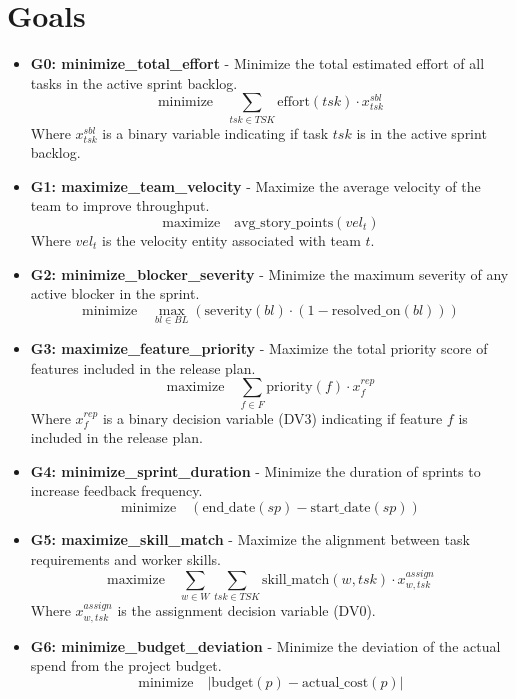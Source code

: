 \documentclass[11pt]{article}
\begin{document}
\section{Goals}
\begin{itemize}
    \item \textbf{G0: minimize\_total\_effort} - Minimize the total estimated effort of all tasks in the active sprint backlog.
        \[ \text{minimize} \quad \sum_{tsk \in TSK} \text{effort}(tsk) \cdot x^{sbl}_{tsk} \]
        Where $x^{sbl}_{tsk}$ is a binary variable indicating if task $tsk$ is in the active sprint backlog.

    \item \textbf{G1: maximize\_team\_velocity} - Maximize the average velocity of the team to improve throughput.
        \[ \text{maximize} \quad \text{avg\_story\_points}(vel_t) \]
        Where $vel_t$ is the velocity entity associated with team $t$.

    \item \textbf{G2: minimize\_blocker\_severity} - Minimize the maximum severity of any active blocker in the sprint.
        \[ \text{minimize} \quad \max_{bl \in BL} \left( \text{severity}(bl) \cdot (1 - \text{resolved\_on}(bl)) \right) \]

    \item \textbf{G3: maximize\_feature\_priority} - Maximize the total priority score of features included in the release plan.
        \[ \text{maximize} \quad \sum_{f \in F} \text{priority}(f) \cdot x^{rep}_f \]
        Where $x^{rep}_f$ is a binary decision variable (DV3) indicating if feature $f$ is included in the release plan.

    \item \textbf{G4: minimize\_sprint\_duration} - Minimize the duration of sprints to increase feedback frequency.
        \[ \text{minimize} \quad (\text{end\_date}(sp) - \text{start\_date}(sp)) \]

    \item \textbf{G5: maximize\_skill\_match} - Maximize the alignment between task requirements and worker skills.
        \[ \text{maximize} \quad \sum_{w \in W} \sum_{tsk \in TSK} \text{skill\_match}(w, tsk) \cdot x^{assign}_{w, tsk} \]
        Where $x^{assign}_{w, tsk}$ is the assignment decision variable (DV0).

    \item \textbf{G6: minimize\_budget\_deviation} - Minimize the deviation of the actual spend from the project budget.
        \[ \text{minimize} \quad | \text{budget}(p) - \text{actual\_cost}(p) | \]


\end{itemize}
\end{document}
